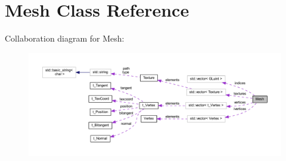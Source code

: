 \hypertarget{class_mesh}{}\section{Mesh Class Reference}
\label{class_mesh}


Collaboration diagram for Mesh\+:
\nopagebreak
\begin{figure}[H]
\begin{center}
\leavevmode
\includegraphics[width=350pt]{class_mesh__coll__graph}
\end{center}
\end{figure}
